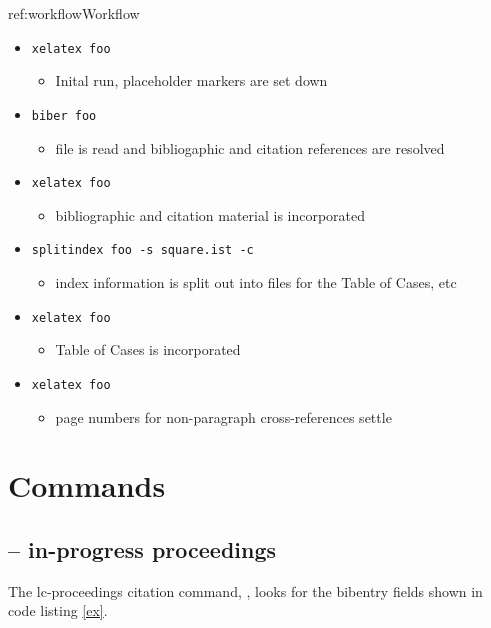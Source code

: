 \begin{dor}{ref:workflow}{Workflow}
\begin{itemize}
\item \verb|xelatex foo|
	\begin{itemize}
	\item Inital run, placeholder markers are set down
	\end{itemize}
\item \verb|biber foo|
	\begin{itemize}
	\item {} file is read and bibliogaphic and citation references are resolved
	\end{itemize}
\item \verb|xelatex foo|
	\begin{itemize}
	\item bibliographic and citation material is incorporated
	\end{itemize}
\item \verb|splitindex foo -s square.ist -c|
	\begin{itemize}
	\item index information is split out into  files for the Table of Cases, etc
	\end{itemize}
\item \verb|xelatex foo|
	\begin{itemize}
	\item Table of Cases is incorporated
	\end{itemize}
\item \verb|xelatex foo|
	\begin{itemize}
	\item page numbers for non-paragraph cross-references settle
	\end{itemize}
\end{itemize}
\end{dor}

\section{Commands}

\subsection{ -- in-progress proceedings}
\p The lc-proceedings citation command, , looks for the bibentry fields shown in code listing \ref{ex}.

